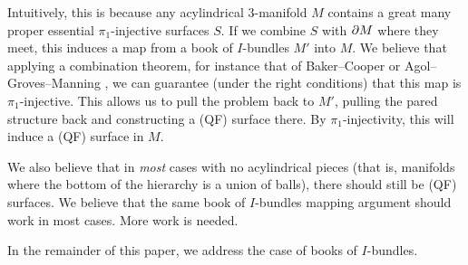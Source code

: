 Intuitively, this is because any acylindrical $3$-manifold $M$ contains a great
many proper essential $\pi_1$-injective surfaces $S$. If we combine $S$ with
$\partial M$ where they meet, this induces a map from a book of $I$-bundles $M'$
into $M$. We believe that applying a combination theorem, for instance that of
Baker--Cooper \cite{BCcombination} or Agol--Groves--Manning
\cite{AGMcombination}, we can guarantee (under the right conditions) that this
map is $\pi_1$-injective. This allows us to pull the problem back to $M'$,
pulling the pared structure back and constructing a (QF) surface there. By
$\pi_1$-injectivity, this will induce a (QF) surface in $M$.

We also believe that in \emph{most} cases with no acylindrical pieces (that is,
manifolds where the bottom of the hierarchy is a union of balls), there should
still be (QF) surfaces. We believe that the same book of $I$-bundles mapping
argument should work in most cases. More work is needed.

In the remainder of this paper, we address the case of books of $I$-bundles.
